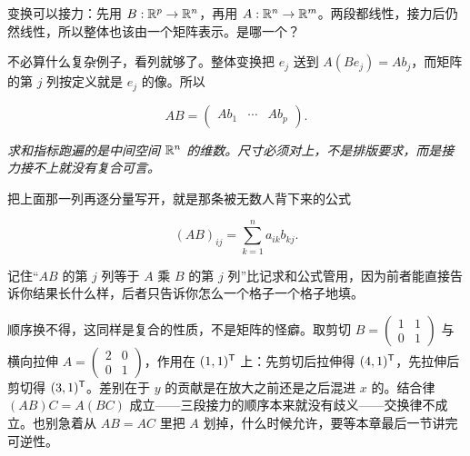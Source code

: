 变换可以接力：先用 \(B:\mathbb{R}^p\to\mathbb{R}^n\)，再用 \(A:\mathbb{R}^n\to\mathbb{R}^m\)。两段都线性，接力后仍然线性，所以整体也该由一个矩阵表示。是哪一个？

不必算什么复杂例子，看列就够了。整体变换把 \(e_j\) 送到 \(A(Be_j)=Ab_j\)，而矩阵的第 \(j\) 列按定义就是 \(e_j\) 的像。所以

\[
AB=\begin{pmatrix}Ab_1&\cdots&Ab_p\end{pmatrix}.
\]

\begin{center}

\emph{求和指标跑遍的是中间空间 \(\mathbb{R}^{n}\) 的维数。尺寸必须对上，不是排版要求，而是接力接不上就没有复合可言。}
\end{center}

把上面那一列再逐分量写开，就是那条被无数人背下来的公式

\[
(AB)_{ij}=\sum_{k=1}^{n}a_{ik}b_{kj}.
\]

记住``\(AB\) 的第 \(j\) 列等于 \(A\) 乘 \(B\) 的第 \(j\) 列''比记求和公式管用，因为前者能直接告诉你结果长什么样，后者只告诉你怎么一个格子一个格子地填。

顺序换不得，这同样是复合的性质，不是矩阵的怪癖。取剪切 \(B=\begin{pmatrix}1&1\\0&1\end{pmatrix}\) 与横向拉伸 \(A=\begin{pmatrix}2&0\\0&1\end{pmatrix}\)，作用在 \((1,1)^{\mathsf{T}}\) 上：先剪切后拉伸得 \((4,1)^{\mathsf{T}}\)，先拉伸后剪切得 \((3,1)^{\mathsf{T}}\)。差别在于 \(y\) 的贡献是在放大之前还是之后混进 \(x\) 的。结合律 \((AB)C=A(BC)\) 成立——三段接力的顺序本来就没有歧义——交换律不成立。也别急着从 \(AB=AC\) 里把 \(A\) 划掉，什么时候允许，要等本章最后一节讲完可逆性。

